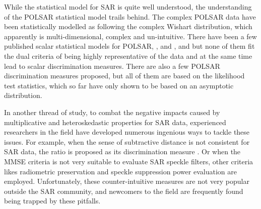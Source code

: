 
While
                the statistical model for SAR is quite well understood,
the
                understanding of the POLSAR statistical model trails behind.
The
                complex POLSAR data have been statistically modelled as
                following the complex Wishart distribution, which
                apparently is multi-dimensional, complex and
                un-intuitive.
There
                have been a few published scalar statistical models for
                POLSAR, \cite{Alberga_2008_IJRS_4129} \cite{Joughin_1994_TGRS_562}, \cite{Lee_1994_TGRS_1017} and \cite{Touzi_1996_TGRS_519} \cite{Barakat_1985_IJOptics}, \cite{Eliyahu_1993_PhysRevE_2881} and \cite{Brosseau_1995_AppliedOptics_4788} but none of them fit the dual criteria of being
                highly representative of the data and at the same time
                lead to scalar discrimination measures.
There
                are also a few POLSAR discrimination measures proposed,
                but all of them are based on the likelihood test
                statistics, which so far have only shown to be based on an
                asymptotic distribution.

 In
                another thread of study, to combat the negative
                impacts caused by multiplicative and heteroskedastic
                properties for SAR data, experienced researchers in the
                field have developed numerous ingenious ways to tackle
                these issues.
For
                example, when the sense of subtractive distance is not
                consistent for SAR data, the ratio is proposed as its
                discrimination measure \cite{Rignot_1993_TGRS_896}.
Or
                when the MMSE criteria is not very suitable to evaluate
                SAR speckle filters, other criteria likes radiometric
                preservation and speckle suppression power evaluation
                are employed. 
Unfortunately,
                these counter-intuitive measures are not very popular
                outside the SAR community, and newcomers to the field
                are frequently found being trapped by these pitfalls.

